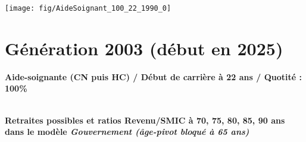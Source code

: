  \vspace{0.1cm} 

 {\hspace{-2.2cm}\texttt{[image: fig/AideSoignant\_100\_22\_1990\_0]}} 

\newpage 
 
\section{Génération 2003 (début en 2025)\label{AideSoignant_100_22_2003_0}} 
 
{\bf \noindent Aide-soignante (CN puis HC) / Début de carrière à 22 ans / Quotité : 100\%}  ~ 

 ~\\{\bf \noindent Retraites possibles et ratios Revenu/SMIC à 70, 75, 80, 85, 90 ans dans le modèle \emph{Gouvernement (âge-pivot bloqué à 65 ans)}}  
 
